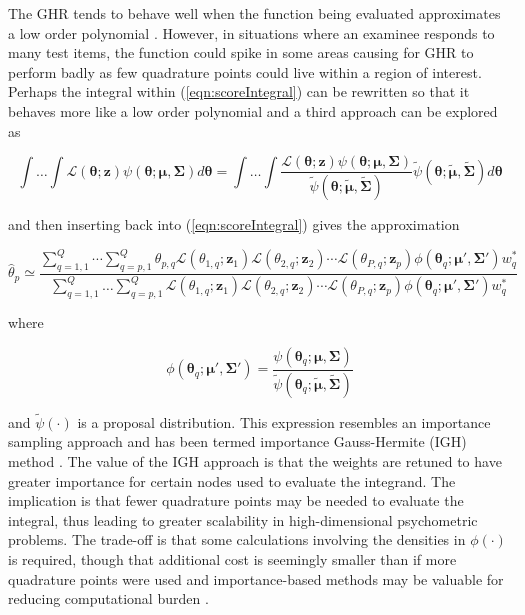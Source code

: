 \documentclass[12pt]{article}
\begin{document}
The GHR tends to behave well when the function being evaluated approximates a low order polynomial \cite{liu:pierce}. However, in situations where an examinee responds to many test items, the function could spike in some areas causing for GHR to perform badly as few quadrature points could live within a region of interest. Perhaps the integral within (\ref{eqn:scoreIntegral}) can be rewritten so that it behaves more like a low order polynomial \cite{ets:2007,pin:bates,hesketh:skrondal,Tuerlinckx} and a third approach can be explored as

\begin{equation}
\int \dots \int \mathcal{L}(\boldsymbol{\theta};\boldsymbol{z})\psi(\boldsymbol{\theta};\boldsymbol{\mu},\boldsymbol{\Sigma})d\boldsymbol{\theta} = \int \dots \int \frac{\mathcal{L}(\boldsymbol{\theta};\boldsymbol{z})\psi(\boldsymbol{\theta};\boldsymbol{\mu},\boldsymbol{\Sigma})}{\widetilde{\psi}(\boldsymbol{\theta};\widetilde{\boldsymbol{\mu}},\widetilde{\boldsymbol{\Sigma}})}\widetilde{\psi}(\boldsymbol{\theta};\widetilde{\boldsymbol{\mu}},\widetilde{\boldsymbol{\Sigma}})d\boldsymbol{\theta}
\end{equation}

\noindent and then inserting back into (\ref{eqn:scoreIntegral}) gives the approximation

\begin{equation}
\label{eqn:intApprox}
\widehat{\theta}_p \simeq  \frac{\sum^Q_{q=1,1} \cdots \sum^Q_{q=p,1}\theta_{p,q} \mathcal{L}(\theta_{1,q};\bm{z}_1) \mathcal{L}(\theta_{2,q};\bm{z}_2)\cdots \mathcal{L}(\theta_{P,q};\bm{z}_p)\phi(\boldsymbol{\theta}_q;\boldsymbol{\mu}',\boldsymbol{\Sigma'})w^*_q}{\sum^Q_{q=1,1} \ldots\sum^Q_{q=p,1}\mathcal{L}(\theta_{1,q};\bm{z}_1) \mathcal{L}(\theta_{2,q};\bm{z}_2) \cdots \mathcal{L}(\theta_{P,q};\bm{z}_p)\phi(\boldsymbol{\theta}_q;\boldsymbol{\mu}',\boldsymbol{\Sigma'})w^*_q}
\end{equation}

\noindent where

\begin{equation}
\label{eqn:mixing}
\phi(\boldsymbol{\theta}_q;\boldsymbol{\mu}',\boldsymbol{\Sigma'}) = \frac{\psi(\boldsymbol{\theta}_q;\boldsymbol{\mu},\boldsymbol{\Sigma})}{\widetilde{\psi}(\boldsymbol{\theta}_q;\widetilde{\boldsymbol{\mu}},\widetilde{\boldsymbol{\Sigma}})}
\end{equation}

\noindent and $\widetilde{\psi}(\cdot)$ is a proposal distribution. This expression resembles an importance sampling approach \cite{gelman} and has been termed importance Gauss-Hermite (IGH) method \cite{elvira}. The value of the IGH approach is that the weights are retuned to have greater importance for certain nodes used to evaluate the integrand. The implication is that fewer quadrature points may be needed to evaluate the integral, thus leading to greater scalability in high-dimensional psychometric problems. The trade-off is that some calculations involving the densities in $\phi(\cdot)$ is required, though that additional cost is seemingly smaller than if more quadrature points were used and importance-based methods may be valuable for reducing computational burden \cite{Ackerberg}. 
\end{document}
